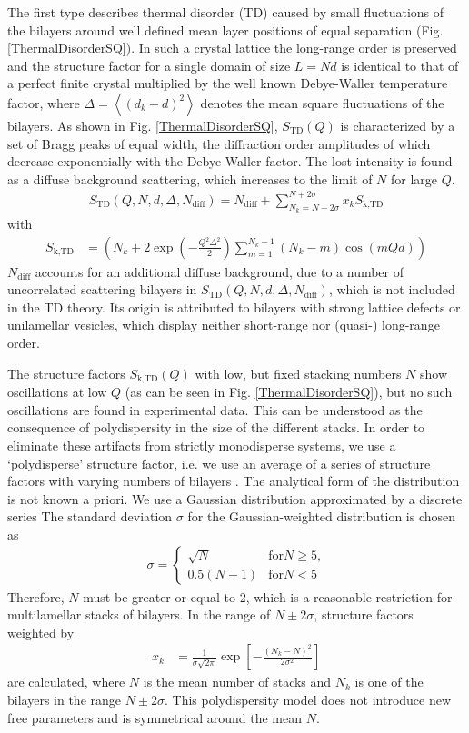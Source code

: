 The first type describes thermal disorder (TD) caused by small
fluctuations of the bilayers around well defined mean layer
positions of equal separation (Fig. \ref{ThermalDisorderSQ}). In
such a crystal lattice the long-range order is preserved and the
structure factor for a single domain of size $L = Nd$ is identical
to that of a perfect finite crystal multiplied by the well known
Debye-Waller temperature factor, where $\Delta = \left<
(d_k-d)^2\right>$ denotes the mean square fluctuations of the
bilayers. As shown in Fig. \ref{ThermalDisorderSQ},
$S_\text{TD}(Q)$ is characterized by a set of Bragg peaks of equal
width, the diffraction order amplitudes of which decrease
exponentially with the Debye-Waller factor. The lost intensity is
found as a diffuse background scattering, which increases to the
limit of $N$ for large $Q$.
\begin{align}
S_\text{TD}(Q,N,d,\Delta,N_\text{diff}) = N_\text{diff} + \sum_{N_k=N-2\sigma}^{N+2\sigma} x_k
S_\text{k,TD}
\end{align}
with
\begin{align}
S_\text{k,TD} & = \left( N_k + 2 \exp\left(
-\frac{Q^2\Delta^2}{2}\right) \sum_{m=1}^{N_k-1} (N_k-m) \cos(mQd)
\right)
\end{align}
$N_\text{diff}$ accounts for an additional
diffuse background, due to a number of uncorrelated
scattering bilayers in $S_\text{TD}(Q,N,d,\Delta,N_\text{diff})$,
which is not included in the TD theory.
Its origin is attributed to bilayers with strong lattice defects or
unilamellar vesicles, which display neither short-range nor
(quasi-) long-range order.

The structure factors $S_\text{k,TD}(Q)$ with low, but fixed
stacking numbers $N$ show oscillations at low $Q$ (as can be seen in
Fig. \ref{ThermalDisorderSQ}), but no such oscillations are found in
experimental data. This can be understood as the consequence of
polydispersity in the size of the different stacks. In order to
eliminate these artifacts from strictly monodisperse systems, we use
a `polydisperse' structure factor, i.e. we use an average of a
series of structure factors with varying numbers of bilayers
\cite{Fruhwirth2004}. The analytical form of the distribution is not
known a priori. We use a Gaussian distribution approximated by a
discrete series The standard deviation $\sigma$ for the
Gaussian-weighted distribution is chosen as
\begin{align}
\sigma =
\begin{cases}
\sqrt{N} & \text{for} N\geq 5 \text{,} \\
0.5(N-1) & \text{for} N< 5
\end{cases}
\end{align}
Therefore, $N$ must be greater or equal to 2, which is a
reasonable restriction for multilamellar stacks of bilayers. In
the range of $N \pm 2\sigma$, structure factors weighted by
\begin{align}
x_k & = \frac{1}{\sigma\sqrt{2\pi}} \exp\left[
-\frac{(N_k-N)^2}{2\sigma^2}\right]
\end{align}
are calculated, where $N$ is the mean number of stacks and $N_k$
is one of the  bilayers in the range $N\pm 2\sigma$. This
polydispersity model does not introduce new free parameters and is
symmetrical around the mean $N$.


